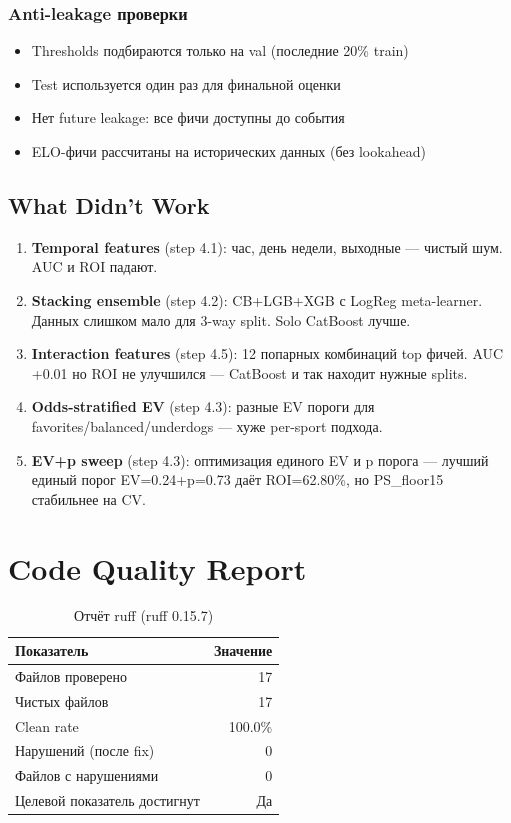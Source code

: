 \documentclass[12pt,a4paper]{article}
\begin{document}
\subsubsection{Anti-leakage проверки}
\begin{itemize}
  \item Thresholds подбираются только на val (последние 20\% train)
  \item Test используется один раз для финальной оценки
  \item Нет future leakage: все фичи доступны до события
  \item ELO-фичи рассчитаны на исторических данных (без lookahead)
\end{itemize}

\subsection{What Didn't Work}

\begin{enumerate}
  \item \textbf{Temporal features} (step 4.1): час, день недели, выходные — чистый шум. AUC и ROI падают.
  \item \textbf{Stacking ensemble} (step 4.2): CB+LGB+XGB с LogReg meta-learner. Данных слишком мало для 3-way split. Solo CatBoost лучше.
  \item \textbf{Interaction features} (step 4.5): 12 попарных комбинаций top фичей. AUC +0.01 но ROI не улучшился — CatBoost и так находит нужные splits.
  \item \textbf{Odds-stratified EV} (step 4.3): разные EV пороги для favorites/balanced/underdogs — хуже per-sport подхода.
  \item \textbf{EV+p sweep} (step 4.3): оптимизация единого EV и p порога — лучший единый порог EV=0.24+p=0.73 даёт ROI=62.80\%, но PS\_floor15 стабильнее на CV.
\end{enumerate}








\section{Code Quality Report}

\begin{table}[H]
\centering
\caption{Отчёт ruff (ruff 0.15.7)}
\begin{tabular}{lr}
\toprule
Показатель & Значение \\
\midrule
Файлов проверено & 17 \\
Чистых файлов & 17 \\
Clean rate & \textcolor{passcolor}{100.0\%} \\
Нарушений (после fix) & \textcolor{passcolor}{0} \\
Файлов с нарушениями & 0 \\
Целевой показатель достигнут & \textcolor{passcolor}{Да} \\
\bottomrule
\end{tabular}
\end{table}
\end{document}
